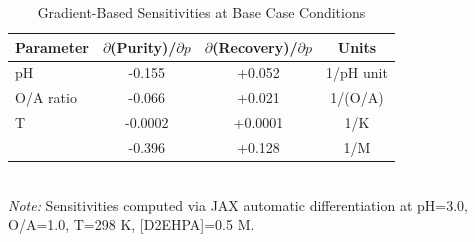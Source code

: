 \begin{table}[htbp]
\centering
\caption{Gradient-Based Sensitivities at Base Case Conditions}
\label{tab:sensitivities}
\begin{tabular}{lccc}
\toprule
Parameter & $\partial$(Purity)/$\partial p$ & $\partial$(Recovery)/$\partial p$ & Units \\
\midrule
pH & -0.155 & +0.052 & 1/pH unit \\
O/A ratio & -0.066 & +0.021 & 1/(O/A) \\
T & -0.0002 & +0.0001 & 1/K \\
[D2EHPA] & -0.396 & +0.128 & 1/M \\
\bottomrule
\end{tabular}
\\[0.5em]
\footnotesize{\textit{Note:} Sensitivities computed via JAX automatic differentiation at pH=3.0, O/A=1.0, T=298 K, [D2EHPA]=0.5 M.}
\end{table}